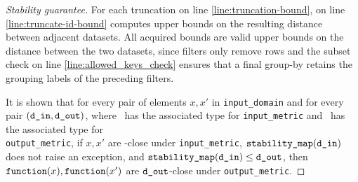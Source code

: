 \documentclass{article}
\begin{document}
\begin{proof}[Stability guarantee]
    For each truncation on line \ref{line:truncation-bound},
     on line \ref{line:truncate-id-bound}
    computes upper bounds on the resulting distance between adjacent datasets.
    All acquired bounds are valid upper bounds on the distance between the two datasets,
    since filters only remove rows and the subset check on line \ref{line:allowed_keys_check}
    ensures that a final group-by retains the grouping labels of the preceding filters.

    It is shown that for every pair of elements $x, x'$ in \texttt{input\_domain} and for every pair $(\texttt{d\_in}, \texttt{d\_out})$,
    where \din\ has the associated type for \texttt{input\_metric} and \dout\ has the associated type for \\ \texttt{output\_metric},
    if $x, x'$ are \din-close under \texttt{input\_metric}, $\texttt{stability\_map}(\texttt{d\_in})$ does not raise an exception,
    and $\texttt{stability\_map}(\texttt{d\_in}) \leq \texttt{d\_out}$,
    then $\texttt{function}(x), \texttt{function}(x')$ are $\texttt{d\_out}$-close under \texttt{output\_metric}.
\end{proof}
\end{document}
